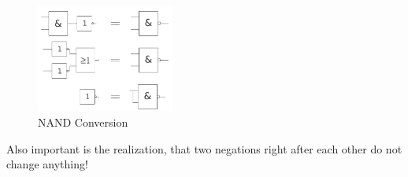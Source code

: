 \documentclass[10pt,a4paper]{article}
\begin{document}
    \begin{figure}[H]
      \centering
      \includegraphics[width=0.4\textwidth]{nand_conversion}%
      \caption{NAND Conversion}%
      \label{fig:nand_conversion}
    \end{figure}

Also important is the realization, that two negations right after each other do not change anything!
\end{document}
